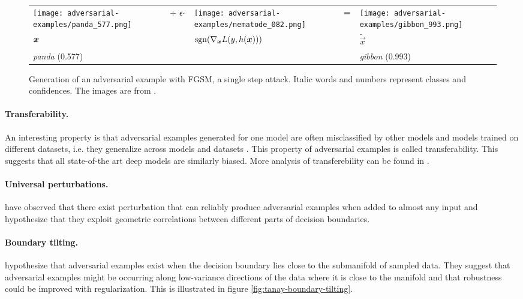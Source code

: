\documentclass{article}
\begin{document}
\begin{figure}
	\centering
	{\small
		\begin{tabular}{>{\centering\arraybackslash}m{}m{.1in}>{\centering\arraybackslash}m{}m{.05in}>{\centering\arraybackslash}m{}}
			\centering\arraybackslash
			\texttt{[image: adversarial-examples/panda\_577.png]} &%
			\centering\arraybackslash%
			$\centering +\ \epsilon \cdot$ &%
			\texttt{[image: adversarial-examples/nematode\_082.png]} &%
			$\centering =$ & %
			\texttt{[image: adversarial-examples/gibbon\_993.png]} \\
			$\centering \vec x$     &%
			& $\sgn\del{\nabla_{\vec x} L(y,h(\vec x))}$ & & $\tilde{\vec x}$ \\
			\emph{panda} (0.577) & & & & \emph{gibbon} (0.993) 
		\end{tabular}
	}
	\caption{Generation of an adversarial example with FGSM, a single step attack. Italic words and numbers represent classes and confidences. The images are from \citet{Goodfellow:2014:EHAE}.}
	\label{fig:fgsm-adversarial-example}
\end{figure}

\paragraph{Transferability.} An interesting property is that adversarial examples generated for one model are often misclassified by other models and models trained on different datasets, i.e. they generalize across models and datasets \citep{Szegedy:2013:IPNN}. This property of adversarial examples is called transferability. This suggests that all state-of-the art deep models are similarly biased. More analysis of transferebility can be found in \citet{Papernot:2016:TMLPBBAAS,Liu:2016:DTAEBBA,Tramer:2017:STAE}. 

\paragraph{Universal perturbations.} \citet{Moosavi-Dezfooli:2016:UAP} have observed that there exist perturbation that can reliably produce adversarial examples when added to almost any input and hypothesize that they exploit geometric correlations between different parts of decision boundaries. 

\paragraph{Boundary tilting.} \citet{Tanay:2016:ABTPPAE} hypothesize that adversarial examples exist when the decision boundary lies close to the submanifold of sampled data. They suggest that adversarial examples might be occurring along low-variance directions of the data where it is close to the manifold and that robustness could be improved with regularization. This is illustrated in figure \ref{fig:tanay-boundary-tilting}.
\end{document}
